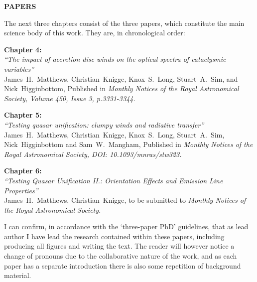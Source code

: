 \pagestyle{empty}  %

\begin{center}
{\huge {\bf PAPERS}}
\end{center}

\bigskip

The next three chapters consist of the three papers, which constitute the
main science body of this work. They are, in chronological order:

\bigskip
{\bf Chapter 4:} \\
{\sl ``The impact of accretion disc winds on the optical spectra of cataclysmic variables''}\\ 
James~H.~Matthews, Christian~Knigge, Knox~S.~Long, Stuart~A.~Sim, 
and Nick~Higginbottom, Published in 
{\sl Monthly Notices of the Royal Astronomical Society, Volume 450, Issue 3, p.3331-3344.}

\bigskip
{\bf Chapter 5:} \\
{\sl ``Testing quasar unification: clumpy winds and radiative transfer''} \\
James~H.~Matthews, Christian~Knigge, Knox~S.~Long, Stuart~A.~Sim, 
Nick~Higginbottom and Sam~W.~Mangham, Published in 
{\sl Monthly Notices of the Royal Astronomical Society, DOI: 10.1093/mnras/stw323.}


\bigskip
{\bf Chapter 6:} \\
{\sl ``Testing Quasar Unification II.: Orientation Effects and Emission Line Properties''}\\
James~H.~Matthews, Christian~Knigge, to be submitted to
{\sl Monthly Notices of the Royal Astronomical Society.}

\bigskip
I can confirm, in accordance with the `three-paper PhD' guidelines, that as lead author
I have lead the research contained within these papers, including producing all figures and
writing the text. The reader will however notice a change of pronouns due to the 
collaborative nature of the work, and as each paper has a separate introduction there is
also some repetition of background material.

\clearpage